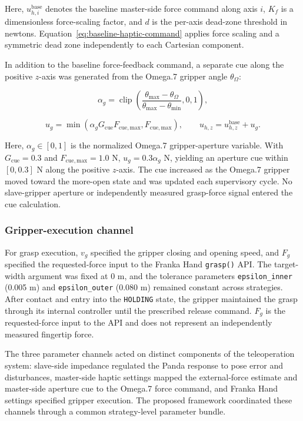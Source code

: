 Here, $u_{h,i}^{\mathrm{base}}$ denotes the baseline master-side force command along axis $i$, $K_f$ is a dimensionless force-scaling factor, and $d$ is the per-axis dead-zone threshold in newtons. Equation~\eqref{eq:baseline-haptic-command} applies force scaling and a symmetric dead zone independently to each Cartesian component.

In addition to the baseline force-feedback command, a separate cue along the positive $z$-axis was generated from the Omega.7 gripper angle $\theta_{\Omega}$:

\begin{equation}
\label{eq:gripper-cue-activation}
\alpha_g=\operatorname{clip}\!\left(
\frac{\theta_{\max}-\theta_{\Omega}}
{\theta_{\max}-\theta_{\min}},0,1\right),
\end{equation}

\begin{equation}
\label{eq:gripper-cue-command}
u_g=\min\!\left(\alpha_gG_{\mathrm{cue}}F_{\mathrm{cue,max}},F_{\mathrm{cue,max}}\right),
\qquad
u_{h,z}=u_{h,z}^{\mathrm{base}}+u_g.
\end{equation}

Here, $\alpha_g\in[0,1]$ is the normalized Omega.7 gripper-aperture variable. With $G_{\mathrm{cue}}=0.3$ and $F_{\mathrm{cue,max}}=1.0$ N, $u_g=0.3\alpha_g$ N, yielding an aperture cue within $[0,0.3]$ N along the positive $z$-axis. The cue increased as the Omega.7 gripper moved toward the more-open state and was updated each supervisory cycle. No slave-gripper aperture or independently measured grasp-force signal entered the cue calculation.

\subsubsection{Gripper-execution channel}
For grasp execution, $v_g$ specified the gripper closing and opening speed, and $F_g$ specified the requested-force input to the Franka Hand \texttt{grasp()} API. The target-width argument was fixed at 0 m, and the tolerance parameters \texttt{epsilon\_inner} (0.005 m) and \texttt{epsilon\_outer} (0.080 m) remained constant across strategies. After contact and entry into the \texttt{HOLDING} state, the gripper maintained the grasp through its internal controller until the prescribed release command. $F_g$ is the requested-force input to the API and does not represent an independently measured fingertip force.

The three parameter channels acted on distinct components of the teleoperation system: slave-side impedance regulated the Panda response to pose error and disturbances, master-side haptic settings mapped the external-force estimate and master-side aperture cue to the Omega.7 force command, and Franka Hand settings specified gripper execution. The proposed framework coordinated these channels through a common strategy-level parameter bundle.


